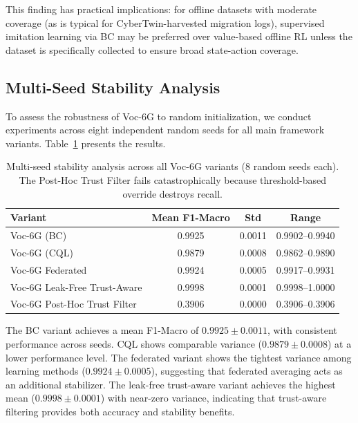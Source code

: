\documentclass[10pt,letterpaper]{article}
\providecommand{\VocSixG}{Voc-6G}
\begin{document}
This finding has practical implications: for offline datasets with moderate coverage (as is typical for CyberTwin-harvested migration logs), supervised imitation learning via BC may be preferred over value-based offline RL unless the dataset is specifically collected to ensure broad state-action coverage.

\subsection*{Multi-Seed Stability Analysis}

To assess the robustness of \VocSixG{} to random initialization, we conduct experiments across eight independent random seeds for all main framework variants. Table~\ref{tab:multiseed} presents the results.

\begin{table}[t]
\centering
\caption{Multi-seed stability analysis across all \VocSixG{} variants (8 random seeds each). The Post-Hoc Trust Filter fails catastrophically because threshold-based override destroys recall.}
\label{tab:multiseed}
\small
\begin{tabular}{lccc}
\toprule
\textbf{Variant} & \textbf{Mean F1-Macro} & \textbf{Std} & \textbf{Range} \\
\midrule
Voc-6G (BC)                          & 0.9925 & 0.0011 & 0.9902--0.9940 \\
Voc-6G (CQL)                         & 0.9879 & 0.0008 & 0.9862--0.9890 \\
Voc-6G Federated                      & 0.9924 & 0.0005 & 0.9917--0.9931 \\
Voc-6G Leak-Free Trust-Aware          & 0.9998 & 0.0001 & 0.9998--1.0000 \\
Voc-6G Post-Hoc Trust Filter          & 0.3906 & 0.0000 & 0.3906--0.3906 \\
\bottomrule
\end{tabular}
\end{table}

The BC variant achieves a mean F1-Macro of $0.9925 \pm 0.0011$, with consistent performance across seeds. CQL shows comparable variance ($0.9879 \pm 0.0008$) at a lower performance level. The federated variant shows the tightest variance among learning methods ($0.9924 \pm 0.0005$), suggesting that federated averaging acts as an additional stabilizer. The leak-free trust-aware variant achieves the highest mean ($0.9998 \pm 0.0001$) with near-zero variance, indicating that trust-aware filtering provides both accuracy and stability benefits.
\end{document}
